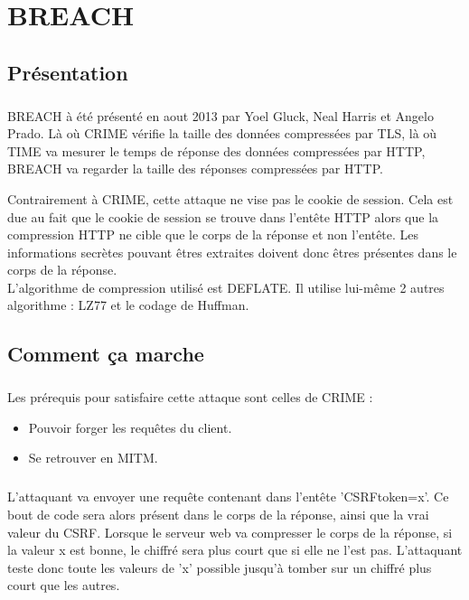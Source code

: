 \chapter{BREACH}
\label{chap:breach}

\section{Présentation}
\paragraph{}
BREACH à été présenté en aout 2013 par Yoel Gluck, Neal Harris et Angelo Prado. Là où CRIME vérifie la taille des données compressées par TLS, là où TIME va mesurer le temps de réponse des données compressées par HTTP, BREACH va regarder la taille des réponses compressées par HTTP.

Contrairement à CRIME, cette attaque ne vise pas le cookie de session. Cela est due au fait que le cookie de session se trouve dans l'entête HTTP alors que la compression HTTP ne cible que le corps de la réponse et non l'entête. Les informations secrètes pouvant êtres extraites doivent donc êtres présentes dans le corps de la réponse.\\

L'algorithme de compression utilisé est DEFLATE. Il utilise lui-même 2 autres algorithme : LZ77 et le codage de Huffman.

\section{Comment ça marche}
\paragraph{}
Les prérequis pour satisfaire cette attaque sont celles de CRIME :
\begin{itemize}
  \item Pouvoir forger les requêtes du client.
  \item Se retrouver en MITM.
\end{itemize}

\paragraph{}
L'attaquant va envoyer une requête contenant dans l'entête 'CSRFtoken=x'. Ce bout de code sera alors présent dans le corps de la réponse, ainsi que la vrai valeur du CSRF. Lorsque le serveur web va compresser le corps de la réponse, si la valeur x est bonne, le chiffré sera plus court que si elle ne l'est pas. L'attaquant teste donc toute les valeurs de 'x' possible jusqu'à tomber sur un chiffré plus court que les autres.


